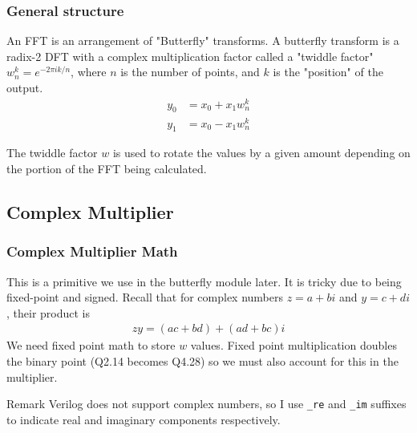\documentclass{beamer}
\begin{document}
\begin{frame}
	\frametitle{General structure}
	An FFT is an arrangement of "Butterfly" transforms.
	A butterfly transform is a radix-2 DFT with a complex multiplication factor called
	a "twiddle factor" $w_n^k = e^{-2\pi i k / n}$, where $n$ is the number of points,
	and $k$ is the "position" of the output.
	\begin{align*}
		y_0 &= x_0 + x_1 w_n^k \\
		y_1 &= x_0 - x_1 w_n^k
	\end{align*}
	\pause
	\begin{figure}
		\centering
	\end{figure}
	The twiddle factor $w$ is used to rotate the values by a given amount depending on the
	portion of the FFT being calculated.

\end{frame}

\subsection{Complex Multiplier}
\begin{frame}
	\frametitle{Complex Multiplier Math}
	This is a primitive we use in the butterfly module later. It is tricky
	due to being fixed-point and signed. \pause Recall that for complex
	numbers $z = a+bi$ and $y = c + di$, their product is
	\begin{align*}
		z y = (ac + bd) + (ad + bc)i
	\end{align*}
	\pause
	We need fixed point math to store $w$ values. Fixed point multiplication doubles
	the binary point (Q2.14 becomes Q4.28) so we must also account for this in the multiplier.

	\begin{block}{Remark}
		Verilog does not support complex numbers, so I use \texttt{\_re} and
		\texttt{\_im} suffixes to indicate real and imaginary components 
		respectively.
	\end{block}
\end{frame}
\end{document}
